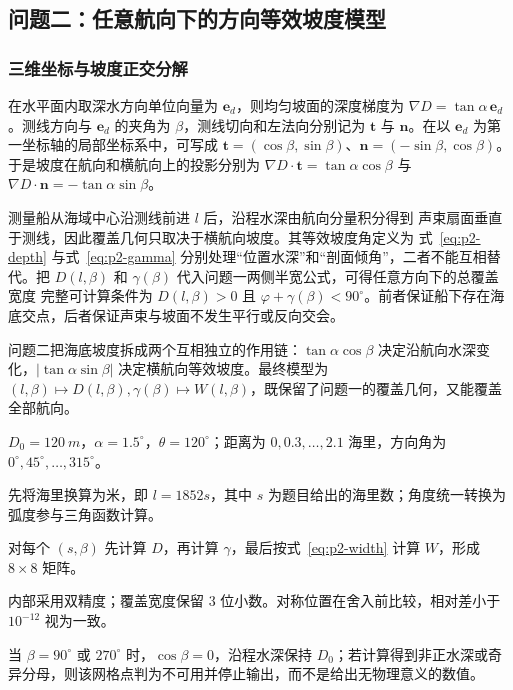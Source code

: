 \subsection{问题二：任意航向下的方向等效坡度模型}
\subsubsection{三维坐标与坡度正交分解}
在水平面内取深水方向单位向量为 $\bm e_d$，则均匀坡面的深度梯度为 $\nabla D=\tan\alpha\,\bm e_d$。测线方向与 $\bm e_d$ 的夹角为 $\beta$，测线切向和左法向分别记为 $\bm t$ 与 $\bm n$。在以 $\bm e_d$ 为第一坐标轴的局部坐标系中，可写成 $\bm t=(\cos\beta,\sin\beta)$、$\bm n=(-\sin\beta,\cos\beta)$。于是坡度在航向和横航向上的投影分别为 $\nabla D\cdot\bm t=\tan\alpha\cos\beta$ 与 $\nabla D\cdot\bm n=-\tan\alpha\sin\beta$。

测量船从海域中心沿测线前进 $l$ 后，沿程水深由航向分量积分得到
声束扇面垂直于测线，因此覆盖几何只取决于横航向坡度。其等效坡度角定义为
式~\eqref{eq:p2-depth} 与式~\eqref{eq:p2-gamma} 分别处理“位置水深”和“剖面倾角”，二者不能互相替代。把 $D(l,\beta)$ 和 $\gamma(\beta)$ 代入问题一两侧半宽公式，可得任意方向下的总覆盖宽度
完整可计算条件为 $D(l,\beta)>0$ 且 $\varphi+\gamma(\beta)<90^\circ$。前者保证船下存在海底交点，后者保证声束与坡面不发生平行或反向交会。

\begin{modelsummary}[问题二模型归纳]
问题二把海底坡度拆成两个互相独立的作用链：$\tan\alpha\cos\beta$ 决定沿航向水深变化，$|\tan\alpha\sin\beta|$ 决定横航向等效坡度。最终模型为 $(l,\beta)\mapsto D(l,\beta),\gamma(\beta)\mapsto W(l,\beta)$，既保留了问题一的覆盖几何，又能覆盖全部航向。
\end{modelsummary}

\begin{solvercontract}[问题二算法求解说明]
\item[输入] $D_0=\SI{120}{m}$，$\alpha=1.5^\circ$，$\theta=120^\circ$；距离为 $0,0.3,\ldots,2.1$ 海里，方向角为 $0^\circ,45^\circ,\ldots,315^\circ$。
\item[单位处理] 先将海里换算为米，即 $l=1852s$，其中 $s$ 为题目给出的海里数；角度统一转换为弧度参与三角函数计算。
\item[计算顺序] 对每个 $(s,\beta)$ 先计算 $D$，再计算 $\gamma$，最后按式~\eqref{eq:p2-width} 计算 $W$，形成 $8\times8$ 矩阵。
\item[精度] 内部采用双精度；覆盖宽度保留 $3$ 位小数。对称位置在舍入前比较，相对差小于 $10^{-12}$ 视为一致。
\item[特殊情况] 当 $\beta=90^\circ$ 或 $270^\circ$ 时，$\cos\beta=0$，沿程水深保持 $D_0$；若计算得到非正水深或奇异分母，则该网格点判为不可用并停止输出，而不是给出无物理意义的数值。
\end{solvercontract}

